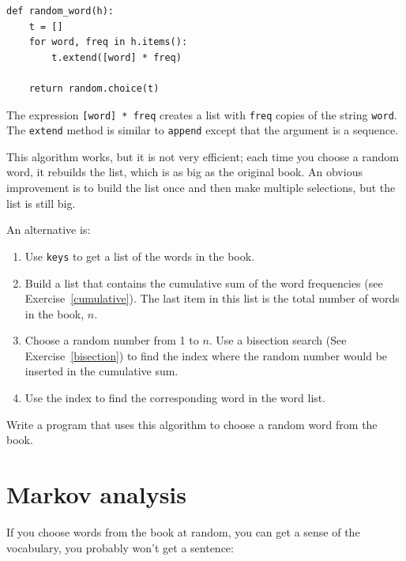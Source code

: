 \documentclass[10pt]{book}
\begin{document}
{\beforeverb
\begin{verbatim}
def random_word(h):
    t = []
    for word, freq in h.items():
        t.extend([word] * freq)

    return random.choice(t)
\end{verbatim}
\afterverb
%
The expression {\tt [word] * freq} creates a list with {\tt freq}
copies of the string {\tt word}.  The {\tt extend}
method is similar to {\tt append} except that the argument is
a sequence.

\begin{ex}
\label{randhist}


This algorithm works, but it is not very efficient; each time you
choose a random word, it rebuilds the list, which is as big as
the original book.  An obvious improvement is to build the list
once and then make multiple selections, but the list is still big.

An alternative is:

\begin{enumerate}

\item Use {\tt keys} to get a list of the words in the book.

\item Build a list that contains the cumulative sum of the word
  frequencies (see Exercise~\ref{cumulative}).  The last item
  in this list is the total number of words in the book, $n$.
  
\item Choose a random number from 1 to $n$.  Use a bisection search
  (See Exercise~\ref{bisection}) to find the index where the random
  number would be inserted in the cumulative sum.

\item Use the index to find the corresponding word in the word list.

\end{enumerate}

Write a program that uses this algorithm to choose a random
word from the book.
\end{ex}



\section{Markov analysis}


If you choose words from the book at random, you can get a
sense of the vocabulary, you probably won't get a sentence:

}
\end{document}
